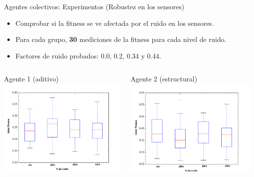 \documentclass[aspectratio=169]{beamer}
\begin{document}
\begin{frame}{Agentes colectivos: Experimentos (Robustez en los sensores)}
  \begin{itemize}
    \item Comprobar si la fitness se ve afectada por el ruido en los sensores.
    \item Para cada grupo, \textbf{30} mediciones de la fitness para cada nivel de ruido.
    \item Factores de ruido probados: 0.0, 0.2, 0.34 y 0.44.
  \end{itemize}
  \vspace{-0.5cm}
  \begin{columns}
    \begin{column}{0.47\textwidth}
      \begin{block}{Agente 1 (aditivo)}
      \includegraphics[width=1.0\textwidth,height=.6\textheight]{Imagenes/BoxPlot1}
    \end{block}
    \end{column}
    \begin{column}{0.5\textwidth}
      \begin{block}{Agente 2 (estructural)}
      \includegraphics[width=1.0\textwidth,height=.6\textheight]{Imagenes/BoxPlot2}

\end{block}
\end{column}
\end{columns}
\end{frame}
\end{document}
